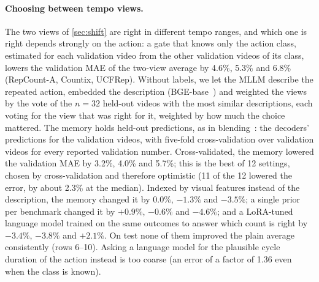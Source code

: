 \paragraph{Choosing between tempo views.} The two views of
\cref{sec:shift} are right in different tempo ranges, and which one is right
depends strongly on the action: a gate that knows only the action class,
estimated for each validation video from the other validation videos of its
class, lowers the validation MAE of the two-view average by 4.6\%, 5.3\% and
6.8\% (RepCount-A, Countix, UCFRep). Without labels, we let the MLLM describe
the repeated action, embedded the description (BGE-base~\cite{xiao2023cpack}) and
weighted the views by the vote of the $n{=}32$ held-out videos with the most
similar descriptions, each voting for the view that was right for it, weighted by
how much the choice mattered. The memory holds held-out predictions, as in
blending~\cite{wolpert1992stacked}: the decoders' predictions for the validation
videos, with five-fold cross-validation over validation videos for every reported
validation number. Cross-validated, the memory lowered the validation MAE by
3.2\%, 4.0\% and 5.7\%; this is the best of 12 settings, chosen by
cross-validation and therefore optimistic (11 of the 12 lowered the error, by
about 2.3\% at the median). Indexed by visual features instead of the
description, the memory changed it by 0.0\%, $-1.3\%$ and $-3.5\%$; a single prior per benchmark changed it by $+0.9\%$,
$-0.6\%$ and $-4.6\%$; and a LoRA-tuned language model trained on the same
outcomes to answer which count is right by $-3.4\%$, $-3.8\%$ and $+2.1\%$. On
test none of them improved the plain average consistently (rows 6--10). Asking a
language model for the plausible cycle duration of the action instead is too
coarse (an error of a factor of 1.36 even when the class is known).

